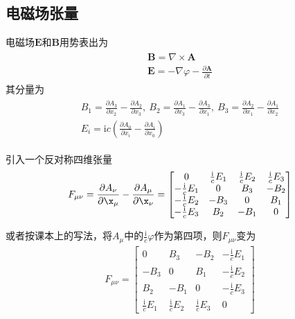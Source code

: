 \documentclass[main.tex]{subfiles}
\begin{document}
\subsection{电磁场张量}
电磁场$\boldsymbol{E}$和$\boldsymbol{B}$用势表出为
\begin{align}
    \begin{array}{c}
         \boldsymbol{B} = \nabla \times \boldsymbol{A}\\
         \boldsymbol{E} = -\nabla \varphi - \frac{\partial \boldsymbol{A}}{\partial t}
    \end{array}
\end{align}
其分量为
\begin{align}
    \begin{array}{c}
        B_1 = \displaystyle \frac{\partial A_3}{\partial x_2} - \displaystyle \frac{\partial A_2}{\partial x_3},\ B_2 = \displaystyle \frac{\partial A_1}{\partial x_3} - \displaystyle \frac{\partial A_3}{\partial x_1},\ B_3 = \displaystyle \frac{\partial A_2}{\partial x_1} - \displaystyle \frac{\partial A_1}{\partial x_2}\\
        E_i = \mathrm{i}c\left(\displaystyle \frac{\partial A_0}{\partial x_i} - \displaystyle \frac{\partial A_i}{\partial x_0} \right)
    \end{array} 
\end{align}

引入一个反对称四维张量
\begin{align}
    F_{\mu \nu} = \frac{\partial A_{\nu}}{\partial \x_{\mu}} - \frac{\partial A_{\mu}}{\partial \x_{\nu}} = 
    \begin{bmatrix}
    0 & \frac{\mathrm{i}}{c}E_1 & \frac{\mathrm{i}}{c}E_2 & \frac{\mathrm{i}}{c}E_3\\
    -\frac{\mathrm{i}}{c}E_1  & 0 & B_3 & -B_2 \\
    -\frac{\mathrm{i}}{c}E_2 & -B_3 & 0 & B_1\\
    -\frac{\mathrm{i}}{c}E_3 & B_2 & -B_1 & 0
    \end{bmatrix}
\end{align}

或者按课本上的写法，将$A_{\mu}$中的$\displaystyle \frac{\mathrm{i}}{c} \varphi$作为第四项，则$F_{\mu \nu}$变为\
\begin{align}
    F_{\mu \nu} = \begin{bmatrix}
    0 & B_3 & -B_2 &-\frac{\mathrm{i}}{c}E_1\\
    -B_3 & 0 & B_1&-\frac{\mathrm{i}}{c}E_2 \\
    B_2 & -B_1 & 0&-\frac{\mathrm{i}}{c}E_3 \\
    \frac{\mathrm{i}}{c}E_1 & \frac{\mathrm{i}}{c}E_2 & \frac{\mathrm{i}}{c}E_3 & 0
    \end{bmatrix}
\end{align}
\end{document}
